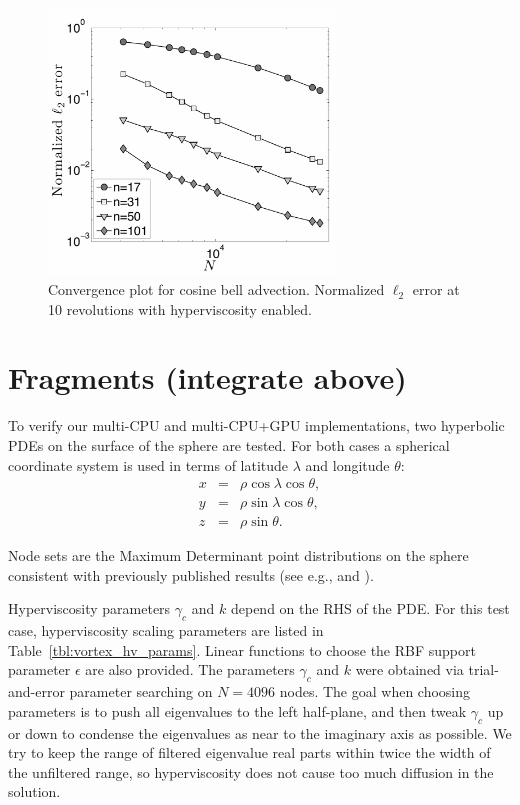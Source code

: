 \documentclass{report}
\begin{document}
\begin{figure}[htbp]
\begin{center}
\includegraphics[width=3in]{../figures/paper1/figures/cosine_bell/convergence_plot_hv.pdf}
\caption{Convergence plot for cosine bell advection. Normalized $\ell_2$ error at 10 revolutions with hyperviscosity enabled. }
\label{fig:conv_cosine_bell}
\end{center}
\end{figure}



\section{Fragments (integrate above)}
To verify our multi-CPU and multi-CPU+GPU implementations, two hyperbolic PDEs on the surface of the sphere are tested. For both cases a spherical coordinate system is used in terms of latitude $\lambda$ and longitude $\theta$:
\begin{eqnarray*} 
x & = & \rho \cos \lambda \cos \theta, 	\\
y & = & \rho \sin \lambda \cos \theta, 		\\
z & = & \rho \sin \theta.		
\end{eqnarray*}

Node sets are the Maximum Determinant point distributions on the sphere \cite{Sloan2003} consistent with previously published results (see e.g., \cite{Flyer2007} and \cite{Fornberg2011b}).

Hyperviscosity parameters $\gamma_c$ and $k$ depend on the RHS of the PDE. 
For this test case, hyperviscosity scaling parameters are listed in Table~\ref{tbl:vortex_hv_params}. Linear functions to choose the RBF support parameter $\epsilon$ are also provided. The parameters $\gamma_c$ and $k$ were obtained via trial-and-error parameter searching on $N=4096$ nodes. The goal when choosing parameters is to push all eigenvalues to the left half-plane, and then tweak $\gamma_c$ up or down to condense the eigenvalues as near to the imaginary axis as possible. We try to keep the range of filtered eigenvalue real parts within twice the width of the unfiltered range, so hyperviscosity does not cause too much diffusion in the solution. 
\end{document}
